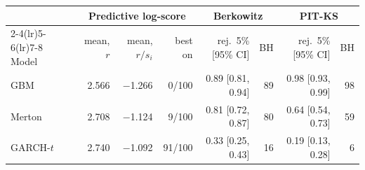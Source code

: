 \begin{tabular}{lrrrrrrr}
\toprule
 & \multicolumn{3}{c}{Predictive log-score} & \multicolumn{2}{c}{Berkowitz} & \multicolumn{2}{c}{PIT-KS} \\
\cmidrule(lr){2-4}\cmidrule(lr){5-6}\cmidrule(lr){7-8}
Model & mean, $r$ & mean, $r/s_i$ & best on & rej.\ 5\% [95\% CI] & BH & rej.\ 5\% [95\% CI] & BH \\
\midrule
GBM & 2.566 & $-$1.266 & 0/100 & 0.89 [0.81, 0.94] & 89 & 0.98 [0.93, 0.99] & 98 \\
Merton & 2.708 & $-$1.124 & 9/100 & 0.81 [0.72, 0.87] & 80 & 0.64 [0.54, 0.73] & 59 \\
GARCH-$t$ & 2.740 & $-$1.092 & 91/100 & 0.33 [0.25, 0.43] & 16 & 0.19 [0.13, 0.28] & 6 \\
\bottomrule
\end{tabular}
